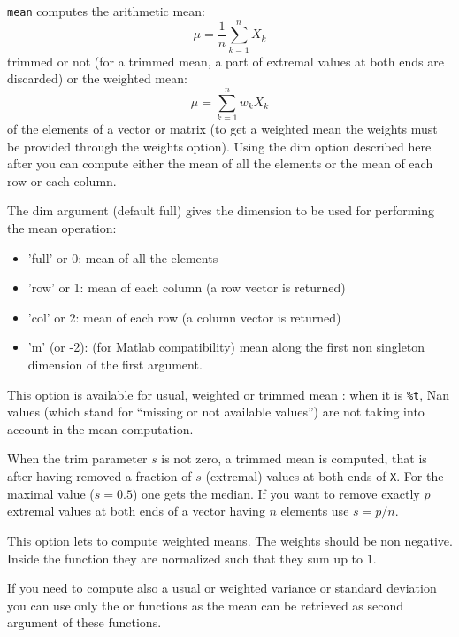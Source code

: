 \begin{mandescription}
  \verb+mean+ computes the arithmetic mean:
$$
    \mu = \frac{1}{n} \sum_{k=1}^n X_k 
$$ 
trimmed or not (for a trimmed mean, a part of extremal values at both ends are discarded) 
or the weighted mean:
$$
    \mu = \sum_{k=1}^n w_k X_k 
$$
of the elements of a vector or matrix (to get a weighted mean the weights must be provided
through the weights option). Using the dim option described here after you can compute either
the mean of all the elements or the mean of each row or each column. 

  The dim argument (default full) gives the dimension to be used for performing the mean operation:
  \begin{itemize}
    \item 'full' or 0: mean of all the elements 
    \item 'row' or 1: mean of each column (a row vector is returned)
    \item 'col' or 2: mean of each row (a column vector is returned)
    \item 'm' (or -2): (for Matlab compatibility) mean along the first non 
          singleton dimension of the first argument.
  \end{itemize}

   This option is available for usual, weighted or trimmed mean : when it is \verb+%t+,  Nan values 
  (which stand for ``missing or not available values'') are not taking into account in the
   mean computation.

  When the trim parameter $s$ is not zero, a trimmed mean is computed, that is
  after having removed a fraction of $s$ (extremal) values at both ends of \verb+X+. For
  the maximal value ($s=0.5$) one gets the median. If you want to remove exactly $p$
  extremal values at both ends of a vector having $n$ elements use $s = p/n$.  
   
  This option lets to compute weighted means. The weights should be non negative. Inside
the function they are normalized such that they sum up to $1$.

  If you need to compute also a usual or weighted variance or standard
deviation you can use only the  or  functions as the
mean can be retrieved as second argument of these functions.

\end{mandescription}
